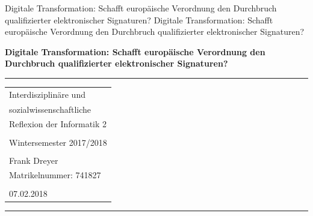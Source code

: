 \documentclass[deutsch]{lib/llncs/llncs}
\begin{document}
\markboth
{Digitale Transformation: Schafft europäische Verordnung den Durchbruch qualifizierter elektronischer Signaturen?}
{Digitale Transformation: Schafft europäische Verordnung den Durchbruch qualifizierter elektronischer Signaturen?}
\thispagestyle{empty}


\begin{flushleft}
\LARGE\bfseries Digitale Transformation: Schafft europäische Verordnung den Durchbruch qualifizierter elektronischer Signaturen?


\end{flushleft}
\rule{\textwidth}{1pt}
\vspace{2pt}


\begin{flushright}
\Huge


\begin{tabular}{@{}l}
Interdisziplinäre und \\
sozialwissenschaftliche \\
Reflexion der Informatik 2\\\\
Wintersemester 2017/2018\\\\
Frank Dreyer\\
Matrikelnummer: 741827\\\\
07.02.2018\\[6pt]
\end{tabular}


\end{flushright}
\rule{\textwidth}{1pt}
\vfill

\newpage
\tableofcontents
\newpage\vspace{2pt}
\end{document}
